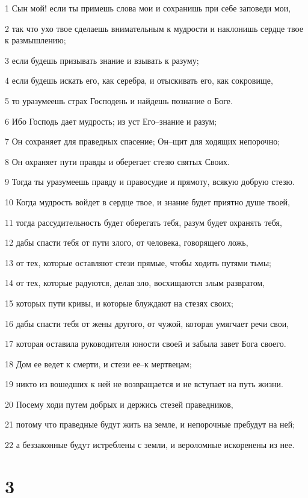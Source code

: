 \par 1 Сын мой! если ты примешь слова мои и сохранишь при себе заповеди мои,
\par 2 так что ухо твое сделаешь внимательным к мудрости и наклонишь сердце твое к размышлению;
\par 3 если будешь призывать знание и взывать к разуму;
\par 4 если будешь искать его, как серебра, и отыскивать его, как сокровище,
\par 5 то уразумеешь страх Господень и найдешь познание о Боге.
\par 6 Ибо Господь дает мудрость; из уст Его--знание и разум;
\par 7 Он сохраняет для праведных спасение; Он--щит для ходящих непорочно;
\par 8 Он охраняет пути правды и оберегает стезю святых Своих.
\par 9 Тогда ты уразумеешь правду и правосудие и прямоту, всякую добрую стезю.
\par 10 Когда мудрость войдет в сердце твое, и знание будет приятно душе твоей,
\par 11 тогда рассудительность будет оберегать тебя, разум будет охранять тебя,
\par 12 дабы спасти тебя от пути злого, от человека, говорящего ложь,
\par 13 от тех, которые оставляют стези прямые, чтобы ходить путями тьмы;
\par 14 от тех, которые радуются, делая зло, восхищаются злым развратом,
\par 15 которых пути кривы, и которые блуждают на стезях своих;
\par 16 дабы спасти тебя от жены другого, от чужой, которая умягчает речи свои,
\par 17 которая оставила руководителя юности своей и забыла завет Бога своего.
\par 18 Дом ее ведет к смерти, и стези ее--к мертвецам;
\par 19 никто из вошедших к ней не возвращается и не вступает на путь жизни.
\par 20 Посему ходи путем добрых и держись стезей праведников,
\par 21 потому что праведные будут жить на земле, и непорочные пребудут на ней;
\par 22 а беззаконные будут истреблены с земли, и вероломные искоренены из нее.

\chapter{3}

